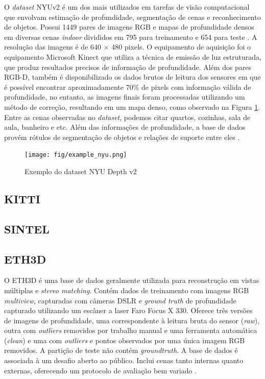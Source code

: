 
O \textit{dataset} NYUv2 é um dos mais utilizados em tarefas de visão computacional que envolvam estimação de profundidade, segmentação de cenas e reconhecimento de objetos. Possui 1449 pares de imagens RGB e mapas de profundidade densos em diversas cenas \textit{indoor} divididos em 795 para treinamento e 654 para teste \cite{silberman2012indoor}. A resolução das imagens é de 640 $\times$ 480 pixels. O equipamento de aquisição foi o equipamento Microsoft Kinect que utiliza a técnica de emissão de luz estruturada, que produz resultados precisos de informação de profundidade. Além dos pares RGB-D, também é disponibilizado os dados brutos de leitura dos sensores em que é possível encontrar aproximadamente 70\% de pixels com informação válida de profundidade, no entanto, as imagens finais foram processadas utilizando um método de correção, resultando em um mapa denso, como observado na Figura \ref{exnyuv2}. Entre as cenas observadas no \textit{dataset}, podemos citar quartos, cozinhas, sala de aula, banheiro e etc. Além das informações de profundidade, a base de dados provém rótulos de segmentação de objetos e relações de suporte entre eles \cite{lahiri2024deep}.

\begin{figure}[h]
    \centering
    \texttt{[image: fig/example\_nyu.png]}
    \caption{Exemplo do dataset NYU Depth v2}
    \label{exnyuv2}
\end{figure}

\subsection{KITTI}



\subsection{SINTEL}

\subsection{ETH3D}

O ETH3D é uma base de dados geralmente utilizada para reconstrução em vistas múltiplas e \textit{stereo matching}. Contém dados de treinamento com imagens RGB \textit{multiview}, capturadas com câmeras DSLR e \textit{ground truth} de profundidade capturado utilizando um escâner a laser Faro Focus X 330. Oferece três versões de imagens de profundidade, uma correspondente à leitura bruta do sensor (\textit{raw}), outra com \textit{outliers} removidos por trabalho manual e uma ferramenta automática (\textit{clean}) e uma com \textit{outliers} e pontos observados por uma única imagem RGB removidos. A partição de teste não contém \textit{groundtruth}. A base de dados é associada à um desafio aberto ao público. Inclui cenas tanto internas quanto externas, oferecendo um protocolo de avaliação bem variado \cite{lahiri2024deep} \cite{schops2019bad}. 

